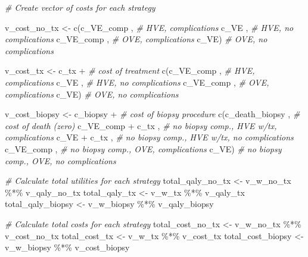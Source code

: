 \documentclass[
]{article}
\newenvironment{Shaded}{\begin{snugshade}}{\end{snugshade}}
\newcommand{\CommentTok}[1]{\textcolor[rgb]{0.56,0.35,0.01}{\textit{#1}}}
\newcommand{\FunctionTok}[1]{\textcolor[rgb]{0.00,0.00,0.00}{#1}}
\newcommand{\NormalTok}[1]{#1}
\newcommand{\OtherTok}[1]{\textcolor[rgb]{0.56,0.35,0.01}{#1}}
\newcommand{\SpecialCharTok}[1]{\textcolor[rgb]{0.00,0.00,0.00}{#1}}
\begin{document}
\begin{Shaded}
\begin{Highlighting}[]
\CommentTok{\# Create vector of costs for each strategy }
  
\NormalTok{v\_cost\_no\_tx  }\OtherTok{\textless{}{-}} \FunctionTok{c}\NormalTok{(c\_VE\_comp ,          }\CommentTok{\# HVE, complications}
\NormalTok{                   c\_VE      ,          }\CommentTok{\# HVE, no complications}
\NormalTok{                   c\_VE\_comp ,          }\CommentTok{\# OVE, complications}
\NormalTok{                   c\_VE)                }\CommentTok{\# OVE, no complications}
  
\NormalTok{v\_cost\_tx     }\OtherTok{\textless{}{-}}\NormalTok{ c\_tx }\SpecialCharTok{+}                 \CommentTok{\# cost of treatment}
                 \FunctionTok{c}\NormalTok{(c\_VE\_comp ,          }\CommentTok{\# HVE, complications}
\NormalTok{                   c\_VE      ,          }\CommentTok{\# HVE, no complications}
\NormalTok{                   c\_VE\_comp ,          }\CommentTok{\# OVE, complications}
\NormalTok{                   c\_VE)                }\CommentTok{\# OVE, no complications}
  
\NormalTok{v\_cost\_biopsy }\OtherTok{\textless{}{-}}\NormalTok{ c\_biopsy           }\SpecialCharTok{+}   \CommentTok{\# cost of biopsy procedure}
                 \FunctionTok{c}\NormalTok{(c\_death\_biopsy   ,   }\CommentTok{\# cost of death (zero)}
\NormalTok{                   c\_VE\_comp }\SpecialCharTok{+}\NormalTok{ c\_tx ,   }\CommentTok{\# no biopsy comp., HVE w/tx, complications }
\NormalTok{                   c\_VE }\SpecialCharTok{+}\NormalTok{ c\_tx      ,   }\CommentTok{\# no biopsy comp., HVE w/tx, no complications}
\NormalTok{                   c\_VE\_comp        ,   }\CommentTok{\# no biopsy comp., OVE, complications}
\NormalTok{                   c\_VE)                }\CommentTok{\# no biopsy comp., OVE, no complications}
 
\CommentTok{\# Calculate total utilities for each strategy }
\NormalTok{total\_qaly\_no\_tx  }\OtherTok{\textless{}{-}}\NormalTok{ v\_w\_no\_tx  }\SpecialCharTok{\%*\%}\NormalTok{  v\_qaly\_no\_tx      }
\NormalTok{total\_qaly\_tx     }\OtherTok{\textless{}{-}}\NormalTok{ v\_w\_tx     }\SpecialCharTok{\%*\%}\NormalTok{  v\_qaly\_tx}
\NormalTok{total\_qaly\_biopsy }\OtherTok{\textless{}{-}}\NormalTok{ v\_w\_biopsy }\SpecialCharTok{\%*\%}\NormalTok{  v\_qaly\_biopsy}
  
\CommentTok{\# Calculate total costs for each strategy }
\NormalTok{total\_cost\_no\_tx  }\OtherTok{\textless{}{-}}\NormalTok{ v\_w\_no\_tx  }\SpecialCharTok{\%*\%}\NormalTok{  v\_cost\_no\_tx    }
\NormalTok{total\_cost\_tx     }\OtherTok{\textless{}{-}}\NormalTok{ v\_w\_tx     }\SpecialCharTok{\%*\%}\NormalTok{  v\_cost\_tx}
\NormalTok{total\_cost\_biopsy }\OtherTok{\textless{}{-}}\NormalTok{ v\_w\_biopsy }\SpecialCharTok{\%*\%}\NormalTok{  v\_cost\_biopsy}
  

\end{Highlighting}
\end{Shaded}
\end{document}
